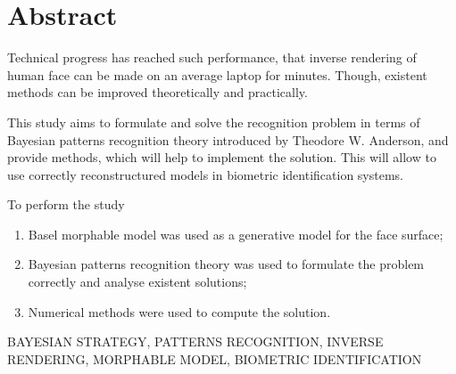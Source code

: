 \chapter*{Abstract}

Technical progress has reached such performance,
that inverse rendering of human face can be made on an average laptop
for minutes.
Though,
existent methods can be improved theoretically and practically.

This study aims to formulate and solve the recognition problem
in terms of Bayesian patterns recognition theory
introduced by Theodore W. Anderson,
and provide methods, which will help to implement the solution.
This will allow to use correctly reconstructured models
in biometric identification systems.

To perform the study
\begin{enumerate}
  \item
    Basel morphable model was used as a generative model for the face surface;
  \item
    Bayesian patterns recognition theory was used
    to formulate the problem correctly and analyse existent solutions;
  \item
    Numerical methods were used to compute the solution.
\end{enumerate}

\MakeUppercase{Bayesian strategy, patterns recognition,
 inverse rendering, morphable model,
biometric identification}
